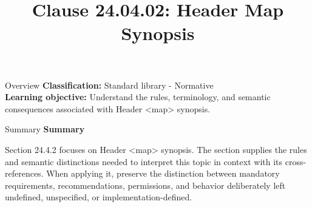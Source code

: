 \documentclass[10pt,letterpaper]{article}
\title{Clause 24.04.02: Header Map Synopsis}
\author{}
\date{}
\begin{document}
\maketitle
\begin{CornellOverviewBox}{Overview}
\textbf{Classification:} Standard library - Normative\\[2pt]
\textbf{Learning objective:} Understand the rules, terminology, and semantic consequences associated with Header <map> synopsis.
\end{CornellOverviewBox}\begin{CornellSummaryBox}{Summary}
{\sffamily\bfseries\color{Accent} Summary}\par\vspace{3pt}Section 24.4.2 focuses on Header <map> synopsis. The section supplies the rules and semantic distinctions needed to interpret this topic in context with its cross-references. When applying it, preserve the distinction between mandatory requirements, recommendations, permissions, and behavior deliberately left undefined, unspecified, or implementation-defined.
\end{CornellSummaryBox}
\end{document}
